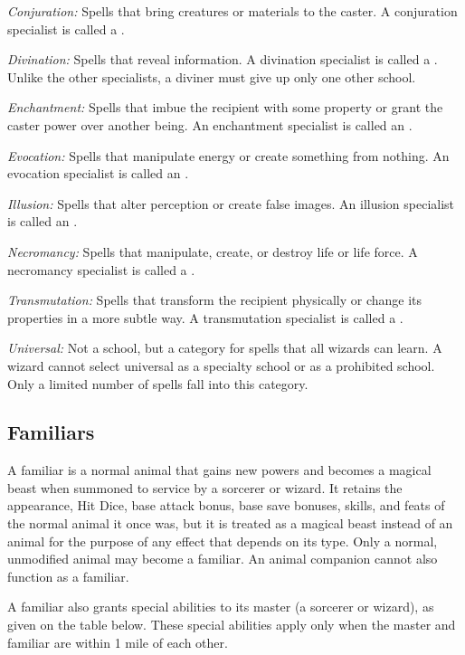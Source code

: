 \textit{Conjuration:} Spells that bring creatures or materials to the caster. A conjuration specialist is called a .

\textit{Divination:} Spells that reveal information. A divination specialist is called a . Unlike the other specialists, a diviner must give up only one other school.

\textit{Enchantment:} Spells that imbue the recipient with some property or grant the caster power over another being. An enchantment specialist is called an .

\textit{Evocation:} Spells that manipulate energy or create something from nothing. An evocation specialist is called an .

\textit{Illusion:} Spells that alter perception or create false images. An illusion specialist is called an .

\textit{Necromancy:} Spells that manipulate, create, or destroy life or life force. A necromancy specialist is called a .

\textit{Transmutation:} Spells that transform the recipient physically or change its properties in a more subtle way. A transmutation specialist is called a .

\textit{Universal:} Not a school, but a category for spells that all wizards can learn. A wizard cannot select universal as a specialty school or as a prohibited school. Only a limited number of spells fall into this category.

\subsection{Familiars}

A familiar is a normal animal that gains new powers and becomes a magical beast when summoned to service by a sorcerer or wizard. It retains the appearance, Hit Dice, base attack bonus, base save bonuses, skills, and feats of the normal animal it once was, but it is treated as a magical beast instead of an animal for the purpose of any effect that depends on its type. Only a normal, unmodified animal may become a familiar. An animal companion cannot also function as a familiar.

A familiar also grants special abilities to its master (a sorcerer or wizard), as given on the table below. These special abilities apply only when the master and familiar are within 1 mile of each other.

